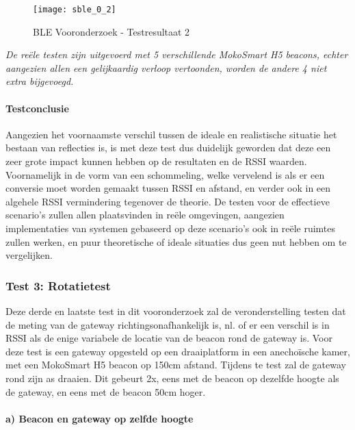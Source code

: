 \begin{figure}[h]
	\texttt{[image: sble\_0\_2]}
	\caption{BLE Vooronderzoek - Testresultaat 2}
	\label{fig:ond-ble-2-res}
\end{figure}

\emph{De reële testen zijn uitgevoerd met 5 verschillende MokoSmart H5 beacons, echter aangezien allen een gelijkaardig verloop vertoonden, worden de andere 4 niet extra bijgevoegd.}

\paragraph{Testconclusie}
Aangezien het voornaamste verschil tussen de ideale en realistische situatie het bestaan van reflecties is, is met deze test dus duidelijk geworden dat deze een zeer grote impact kunnen hebben op de resultaten en de RSSI waarden. Voornamelijk in de vorm van een schommeling, welke vervelend is als er een conversie moet worden gemaakt tussen RSSI en afstand, en verder ook in een algehele RSSI vermindering tegenover de theorie. 
De testen voor de effectieve scenario's zullen allen plaatsvinden in reële omgevingen, aangezien implementaties van systemen gebaseerd op deze scenario's ook in reële ruimtes zullen werken, en puur theoretische of ideale situaties dus geen nut hebben om te vergelijken.

\subsubsection{Test 3: Rotatietest}
Deze derde en laatste test in dit vooronderzoek zal de veronderstelling testen dat de meting van de gateway richtingsonafhankelijk is, nl. of er een verschil is in RSSI als de enige variabele de locatie van de beacon rond de gateway is.
Voor deze test is een gateway opgesteld op een draaiplatform in een anechoïsche kamer, met een MokoSmart H5 beacon op 150cm afstand. Tijdens te test zal de gateway rond zijn as draaien. Dit gebeurt 2x, eens met de beacon op dezelfde hoogte als de gateway, en eens met de beacon 50cm hoger.

\paragraph{a) Beacon en gateway op zelfde hoogte}

